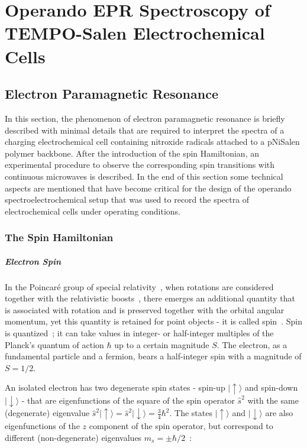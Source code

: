 \chapter{Operando EPR Spectroscopy of TEMPO-Salen Electrochemical Cells}

\section{Electron Paramagnetic Resonance}
In this section, the phenomenon of electron paramagnetic resonance is briefly described with minimal details that are required to interpret the spectra of a charging electrochemical cell containing nitroxide radicals attached to a pNiSalen polymer backbone. After the introduction of the spin Hamiltonian, an experimental procedure to observe the corresponding spin transitions with continuous microwaves is described. In the end of this section some technical aspects are mentioned that have become critical for the design of the operando spectroelectrochemical setup that was used to record the spectra of electrochemical cells under operating conditions.

\subsection{The Spin Hamiltonian}
\paragraph*{Electron Spin}
In the Poincaré group of special relativity~\cite{poincare_1905}, when rotations are considered together with the relativistic boosts~\cite{einstein_s_rel}, there emerges an additional quantity that is associated with rotation and is preserved together with the orbital angular momentum, yet this quantity is retained for point objects - it is called spin~\cite{kuprov_2023}. Spin is quantized~\cite{SternGerlach1922}; it can take values in integer- or half-integer multiples of the Planck's quantum of action $\hbar$ up to a certain magnitude $S$. The electron, as a fundamental particle and a fermion, bears a half-integer spin with a magnitude of $S=1/2$. 

\par
An isolated electron has two degenerate spin states - spin-up $\vert{\uparrow}\rangle$ and spin-down $\vert{\downarrow}\rangle$ - that are eigenfunctions of the square of the spin operator $\hat{s}^2$ with the same (degenerate) eigenvalue $\hat{s}^2\vert{\uparrow}\rangle=\hat{s}^2\vert{\downarrow}\rangle=\frac{3}{4}\hbar^2$. The states $\vert{\uparrow}\rangle$ and $\vert{\downarrow}\rangle$ are also eigenfunctions of the $z$ component of the spin operator, but correspond to different (non-degenerate) eigenvalues $m_s=\pm\hbar/2$~\cite{Sakurai}: 

